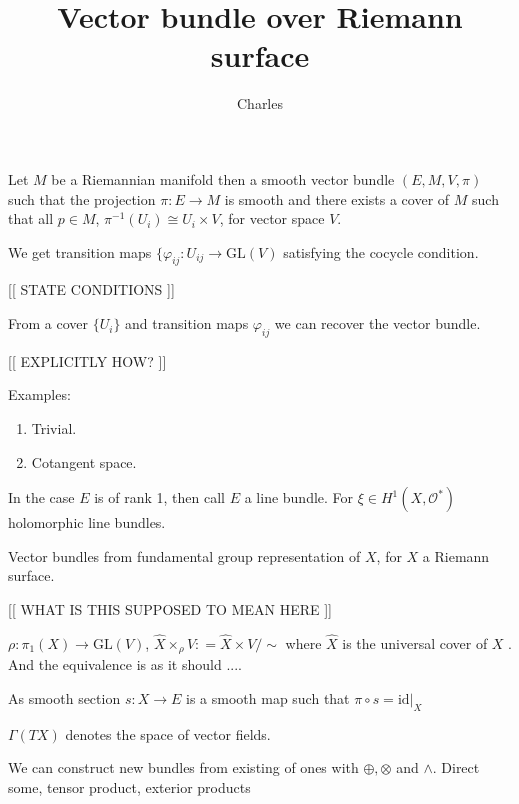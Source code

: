 % 


\title{Vector bundle over Riemann surface}
\author{Charles}
\date{}

 
\maketitle

\begin{definition}
    Let $M$ be a Riemannian manifold 
    then a smooth vector bundle $(E, M, V, \pi) $ such that the projection 
    $ \pi : E \rightarrow  M $ is smooth and 
    there exists a cover of $M$ such that all $ p \in M $, $ \pi^{-1} (U_i) \cong U_i \times V $, for vector space $V$. 
\end{definition}

We get transition maps $ \{ \varphi_{ij} : U_{ij} \rightarrow  \mathrm{GL} ( V) $ satisfying the cocycle condition.

[[ STATE CONDITIONS ]]

From a cover $\{U_i \} $ and transition maps $ \varphi _{ij} $ we can recover the vector bundle. 

[[ EXPLICITLY HOW? ]]

Examples: 
\begin{enumerate}
    \item Trivial. 
    \item Cotangent space. 
\end{enumerate}

In the case $ E$ is of rank 1, then call $E$ a line bundle. 
For $ \xi \in H^1( X, \mathcal{O} ^* ) $ holomorphic line bundles. 

Vector bundles from fundamental group representation of $X$, for $X$ a Riemann surface. 

[[ WHAT IS THIS SUPPOSED TO MEAN HERE ]] 

$\rho : \pi_1 ( X) \rightarrow  \mathrm{GL} (V) $, 
$ \hat{X} \times _\rho V : = \hat{X} \times V / \sim $
where $ \hat{X} $ is the universal cover of $ X $ .
And the equivalence is as it should ....


\begin{definition}
    As smooth section $ s: X \rightarrow  E $ is a smooth map such that $ \pi \circ s  = \mathrm{id} | _ X $ 
\end{definition}

$\Gamma ( TX) $ denotes the space of vector fields.

We can construct new bundles from existing of ones with $ \oplus, \otimes$ and $ \wedge $. 
Direct some, tensor product, exterior products 

